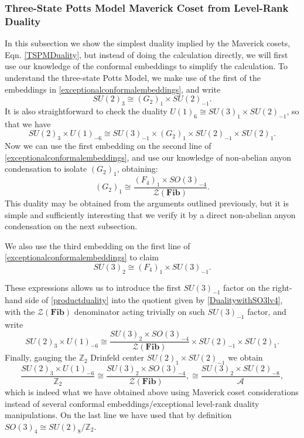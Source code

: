 \documentclass[11pt]{article}
\numberwithin{equation}{section}
\begin{document}
\subsubsection{Three-State Potts Model Maverick Coset from Level-Rank Duality} \label{TSPMfromLevelRank}

In this subsection we show the simplest duality implied by the Maverick cosets, Eqn. \eqref{TSPMDuality}, but instead of doing the calculation directly, we will first use our knowledge of the conformal embeddings to simplify the calculation. To understand the three-state Potts Model, we make use of the first of the embeddings in \eqref{exceptionalconformalembeddings}, and write
\begin{equation}
    SU(2)_{3} \cong (G_{2})_{1} \times SU(2)_{-1}.
\end{equation}
It is also straightforward to check the duality $U(1)_{6} \cong SU(3)_{1} \times SU(2)_{-1}$, so that we have
\begin{equation} \label{productduality}
    SU(2)_{3} \times U(1)_{-6} \cong SU(3)_{-1} \times (G_{2})_{1} \times SU(2)_{-1} \times SU(2)_{1}.
\end{equation}
Now we can use the first embedding on the second line of \eqref{exceptionalconformalembeddings}, and use our knowledge of non-abelian anyon condensation to isolate $(G_{2})_{1}$, obtaining:
\begin{equation} \label{DualitywithSO3lv4}
    (G_{2})_{1} \cong \frac{(F_{4})_{1} \times SO(3)_{-4}}{\mathcal{Z}(\mathbf{Fib})}.
\end{equation}
This duality may be obtained from the arguments outlined previously, but it is simple and sufficiently interesting that we verify it by a direct non-abelian anyon condensation on the next subsection.

We also use the third embedding on the first line of \eqref{exceptionalconformalembeddings} to claim
\begin{equation}
    SU(3)_{2} \cong (F_{4})_{1} \times SU(3)_{-1}.
\end{equation}

These expressions allows us to introduce the first $SU(3)_{-1}$ factor on the right-hand side of \eqref{productduality} into the quotient given by \eqref{DualitywithSO3lv4}, with the $\mathcal{Z}(\mathbf{Fib})$ denominator acting trivially on such $SU(3)_{-1}$ factor, and write
\begin{equation}
    SU(2)_{3} \times U(1)_{-6} \cong \frac{SU(3)_{2} \times SO(3)_{-4}}{\mathcal{Z}(\mathbf{Fib})} \times SU(2)_{-1} \times SU(2)_{1}.
\end{equation}
Finally, gauging the $\mathbb{Z}_{2}$ Drinfeld center $SU(2)_{1} \times SU(2)_{-1}$ we obtain
\begin{equation}
    \frac{SU(2)_{3} \times U(1)_{-6}}{\mathbb{Z}_{2}} \cong \frac{SU(3)_{2} \times SO(3)_{-4}}{\mathcal{Z}(\mathbf{Fib})}, \cong \frac{SU(3)_{2} \times SU(2)_{-8}}{\mathcal{A}},
\end{equation}
which is indeed what we have obtained above using Maverick coset considerations instead of several conformal embeddings/exceptional level-rank duality manipulations. On the last line we have used that by definition $SO(3)_{4} \cong SU(2)_{8}/\mathbb{Z}_{2}$.
\end{document}
